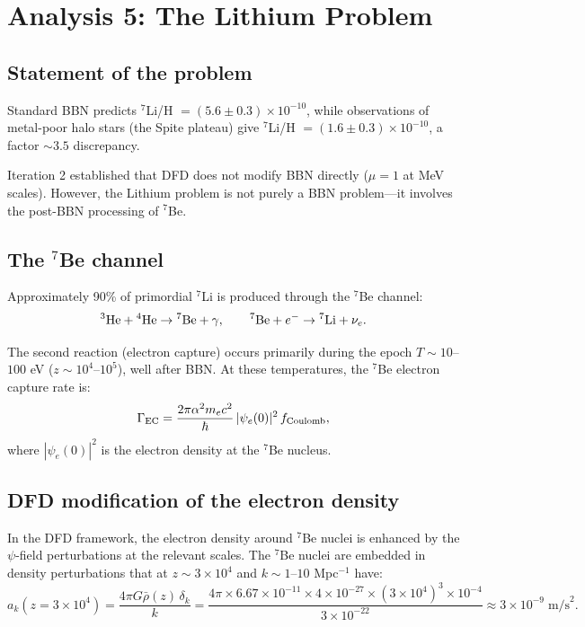 \documentclass[11pt]{article}
\newcommand{\ee}[1]{\times 10^{#1}}
\begin{document}
\section{Analysis 5: The Lithium Problem}
\label{sec:lithium}

\subsection{Statement of the problem}

Standard BBN predicts $^7$Li/H $= (5.6 \pm 0.3) \times 10^{-10}$, while observations of metal-poor halo stars (the Spite plateau) give $^7$Li/H $= (1.6 \pm 0.3) \times 10^{-10}$, a factor $\sim 3.5$ discrepancy.

Iteration 2 established that DFD does not modify BBN directly ($\mu = 1$ at MeV scales). However, the Lithium problem is not purely a BBN problem---it involves the post-BBN processing of $^7$Be.

\subsection{The $^7$Be channel}

Approximately 90\% of primordial $^7$Li is produced through the $^7$Be channel:
\begin{equation}
{}^3{\rm He} + {}^4{\rm He} \to {}^7{\rm Be} + \gamma, \qquad {}^7{\rm Be} + e^- \to {}^7{\rm Li} + \nu_e.
\end{equation}

The second reaction (electron capture) occurs primarily during the epoch $T \sim 10$--$100$ eV ($z \sim 10^4$--$10^5$), well after BBN. At these temperatures, the $^7$Be electron capture rate is:
\begin{equation}
\Gamma_{\rm EC} = \frac{2\pi\alpha^2 m_e c^2}{\hbar}\,|\psi_e(0)|^2\,f_{\rm Coulomb},
\end{equation}
where $|\psi_e(0)|^2$ is the electron density at the $^7$Be nucleus.

\subsection{DFD modification of the electron density}

In the DFD framework, the electron density around $^7$Be nuclei is enhanced by the $\psi$-field perturbations at the relevant scales. The $^7$Be nuclei are embedded in density perturbations that at $z \sim 3 \times 10^4$ and $k \sim 1$--$10$ Mpc$^{-1}$ have:
\begin{equation}
a_k(z = 3\ee{4}) = \frac{4\pi G\bar\rho(z)\,\delta_k}{k} = \frac{4\pi \times 6.67\ee{-11} \times 4\ee{-27} \times (3\ee{4})^3 \times 10^{-4}}{3\ee{-22}} \approx 3\ee{-9}\;\text{m/s}^2.
\end{equation}
\end{document}

